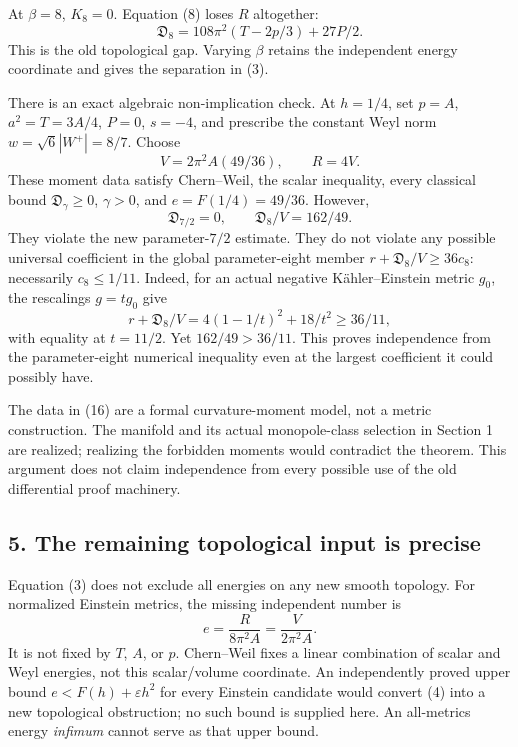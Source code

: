 \documentclass[
  10pt,
]{article}
\begin{document}
At \(\beta=8\), \(K_8=0\). Equation (8) loses \(R\) altogether: \[
 \mathfrak D_8=108\pi^2(T-2p/3)+27P/2.
 \tag{15}
\] This is the old topological gap. Varying \(\beta\) retains the
independent energy coordinate and gives the separation in (3).

There is an exact algebraic non-implication check. At \(h=1/4\), set
\(p=A\), \(a^2=T=3A/4\), \(P=0\), \(s=-4\), and prescribe the constant
Weyl norm \(w=\sqrt6|W^+|=8/7\). Choose \[
 V=2\pi^2A(49/36),\qquad R=4V.
\] These moment data satisfy Chern--Weil, the scalar inequality, every
classical bound \(\mathfrak D_\gamma\ge0\), \(\gamma>0\), and
\(e=F(1/4)=49/36\). However, \[
 \mathfrak D_{7/2}=0,\qquad \mathfrak D_8/V=162/49.
 \tag{16}
\] They violate the new parameter-\(7/2\) estimate. They do not violate
any possible universal coefficient in the global parameter-eight member
\(r+\mathfrak D_8/V\ge36c_8\): necessarily \(c_8\le1/11\). Indeed, for
an actual negative Kähler--Einstein metric \(g_0\), the rescalings
\(g=tg_0\) give \[
 r+\mathfrak D_8/V=4(1-1/t)^2+18/t^2
 \ge36/11,
\] with equality at \(t=11/2\). Yet \(162/49>36/11\). This proves
independence from the parameter-eight numerical inequality even at the
largest coefficient it could possibly have.

The data in (16) are a formal curvature-moment model, not a metric
construction. The manifold and its actual monopole-class selection in
Section 1 are realized; realizing the forbidden moments would contradict
the theorem. This argument does not claim independence from every
possible use of the old differential proof machinery.

\hypertarget{the-remaining-topological-input-is-precise}{%
\subsection{5. The remaining topological input is
precise}\label{the-remaining-topological-input-is-precise}}

Equation (3) does not exclude all energies on any new smooth topology.
For normalized Einstein metrics, the missing independent number is \[
 e=\frac{R}{8\pi^2A}=\frac{V}{2\pi^2A}.
 \tag{17}
\] It is not fixed by \(T\), \(A\), or \(p\). Chern--Weil fixes a linear
combination of scalar and Weyl energies, not this scalar/volume
coordinate. An independently proved upper bound
\(e<F(h)+\varepsilon h^2\) for every Einstein candidate would convert
(4) into a new topological obstruction; no such bound is supplied here.
An all-metrics energy \emph{infimum} cannot serve as that upper bound.
\end{document}
